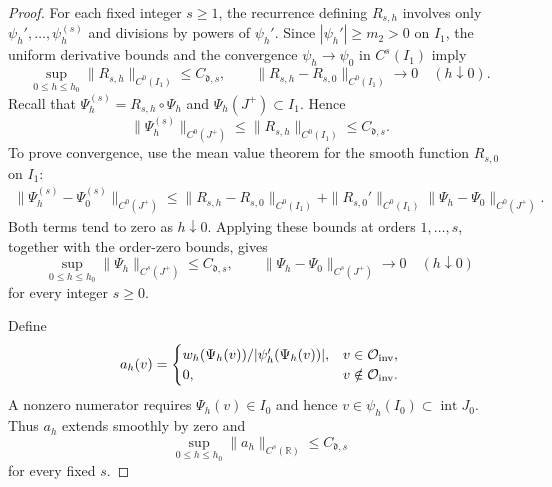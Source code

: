 \documentclass[reqno,12pt]{amsart}
\def \R {\mathbb R}
\numberwithin{equation}{section}
\begin{document}
\begin{proof}

For each fixed integer $s\ge1$, the recurrence defining $R_{s,h}$
involves only $\psi_h',\ldots,\psi_h^{(s)}$ and divisions by
powers of $\psi_h'$. Since $|\psi_h'|\ge m_2>0$ on $I_1$,
the uniform derivative bounds and the convergence
$\psi_h\to\psi_0$ in $C^s(I_1)$ imply
\[
\sup_{0\le h\le h_0}\|R_{s,h}\|_{C^0(I_1)}
\le C_{\mathfrak d,s},
\qquad
\|R_{s,h}-R_{s,0}\|_{C^0(I_1)}\longrightarrow0
\quad(h\downarrow0).
\]
Recall that
$\Psi_h^{(s)}=R_{s,h}\circ\Psi_h$ and
$\Psi_h(J^+)\subset I_1$. Hence
\[
\|\Psi_h^{(s)}\|_{C^0(J^+)}
\le \|R_{s,h}\|_{C^0(I_1)}
\le C_{\mathfrak d,s}.
\]
To prove convergence, use the mean value theorem for the
smooth function $R_{s,0}$ on $I_1$:
\[
\begin{aligned}
\|\Psi_h^{(s)}-\Psi_0^{(s)}\|_{C^0(J^+)}
\le \|R_{s,h}-R_{s,0}\|_{C^0(I_1)}
+
\|R_{s,0}'\|_{C^0(I_1)}
\|\Psi_h-\Psi_0\|_{C^0(J^+)}.
\end{aligned}
\]
Both terms tend to zero as $h\downarrow0$. 
Applying these bounds at orders $1,\ldots,s$, together with the
order-zero bounds, gives
\[
\sup_{0\le h\le h_0}\|\Psi_h\|_{C^s(J^+)}
\le C_{\mathfrak d,s},
\qquad
\|\Psi_h-\Psi_0\|_{C^s(J^+)}\longrightarrow0
\quad(h\downarrow0)
\]
for every integer $s\ge0$. 

Define
\begin{equation}
 a_h(v)=
 \begin{cases}
 w_h(\Psi_h(v))/|\psi_h'(\Psi_h(v))|,&v\in\mathcal O_{\rm inv},\\
 0,&v\notin\mathcal O_{\rm inv}.
 \end{cases}
 \label{eq3-add-inverse-amplitude}
\end{equation}
A nonzero numerator requires $\Psi_h(v)\in I_0$ and hence
$v\in\psi_h(I_0)\subset\operatorname{int}J_0$.
Thus $a_h$ extends smoothly by zero and
$$\sup_{0\le h\le h_0}\|a_h\|_{C^s(\R)}\le C_{\mathfrak d,s}$$ for every fixed $s$.


\end{proof}
\end{document}
